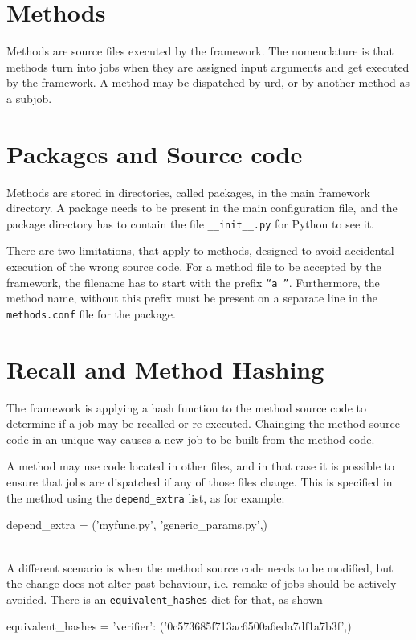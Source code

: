 \section{Methods}

Methods are source files executed by the framework.  The nomenclature
is that methods turn into jobs when they are assigned input arguments
and get executed by the framework.  A method may be dispatched by urd,
or by another method as a subjob.



\section{Packages and Source code}

Methods are stored in directories, called packages, in the main
framework directory.  A package needs to be present in the main
configuration file, and the package directory has to contain the file
\texttt{\_\_init\_\_.py} for Python to see it.

There are two limitations, that apply to methods, designed to avoid
accidental execution of the wrong source code.  For a method file to
be accepted by the framework, the filename has to start with the
prefix \texttt{``a\_''}.  Furthermore, the method name, without this
prefix must be present on a separate line in the \texttt{methods.conf}
file for the package.



\section{Recall and Method Hashing}

The framework is applying a hash function to the method source code to
determine if a job may be recalled or re-executed.  Chainging the
method source code in an unique way causes a new job to be built from
the method code.

A method may use code located in other files, and in that case it is
possible to ensure that jobs are dispatched if any of those files
change.  This is specified in the method using the
\texttt{depend\_extra} list, as for example:
\\
\begin{python}
depend_extra = ('myfunc.py', 'generic_params.py',)
\end{python}
\\
A different scenario is when the method source code needs to be
modified, but the change does not alter past behaviour, i.e. remake of
jobs should be actively avoided.  There is an
\texttt{equivalent\_hashes} dict for that, as shown
\\
\begin{python}
  equivalent_hashes = {'verifier': ('0c573685f713ac6500a6eda7df1a7b3f',)}
\end{python}


